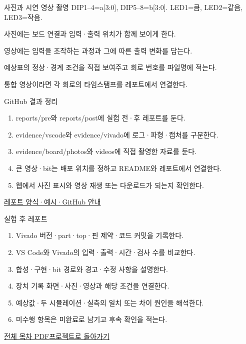 \begin{frame}{사진과 시연 영상 촬영}\relax
\small
DIP1–4=a[3:0], DIP5–8=b[3:0]. LED1=큼, LED2=같음, LED3=작음.\par\vspace{0.22cm}사진에는 보드 연결과 입력·출력 위치가 함께 보이게 한다.\par\vspace{0.22cm}영상에는 입력을 조작하는 과정과 그에 따른 출력 변화를 담는다.\par\vspace{0.22cm}예상표의 정상·경계 조건을 직접 보여주고 회로 번호를 파일명에 적는다.\par\vspace{0.22cm}통합 영상이라면 각 회로의 타임스탬프를 레포트에서 연결한다.\par
\end{frame}

\begin{frame}{GitHub 결과 정리}\relax
\small
\begin{enumerate}\setlength{\itemsep}{0.22cm}
\item reports/pre와 reports/post에 실험 전·후 레포트를 둔다.
\item evidence/vscode와 evidence/vivado에 로그·파형·캡처를 구분한다.
\item evidence/board/photos와 videos에 직접 촬영한 자료를 둔다.
\item 큰 영상·bit는 배포 위치를 정하고 README와 레포트에서 연결한다.
\item 웹에서 사진 표시와 영상 재생 또는 다운로드가 되는지 확인한다.
\end{enumerate}
\href{https://github.com/Glaysia/ece2_26_2_2/blob/daily/0910/example/fpga_projects_hdl/LAB1/docs/reports.md}{레포트 양식·예시·GitHub 안내}
\end{frame}

\begin{frame}{실험 후 레포트}\relax
\small
\begin{enumerate}\setlength{\itemsep}{0.22cm}
\item Vivado 버전·part·top·핀 제약·코드 커밋을 기록한다.
\item VS Code와 Vivado의 입력·출력·시간·검사 수를 비교한다.
\item 합성·구현·bit 경로와 경고·수정 사항을 설명한다.
\item 장치 기록 화면·사진·영상과 해당 조건을 연결한다.
\item 예상값·두 시뮬레이션·실측의 일치 또는 차이 원인을 해석한다.
\item 미수행 항목은 미완료로 남기고 후속 확인을 적는다.
\end{enumerate}
\href{04.LAB1_00_CONTENTS.pdf}{전체 목차 PDF}\quad\href{https://github.com/Glaysia/fpga-lab-example-vivado-2026-1-05-comparator4/tree/913b0f41c48c2351cdaba21380d0d83770c43445}{프로젝트로 돌아가기}
\end{frame}
\endgroup

